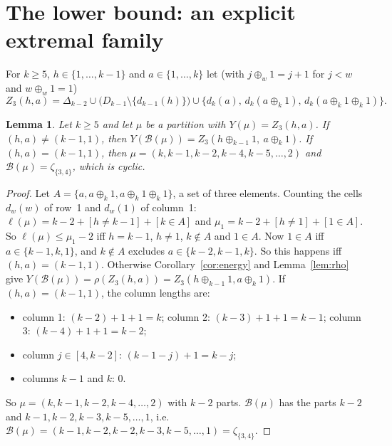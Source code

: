 \documentclass[11pt]{article}
\newtheorem{lemma}[theorem]{Lemma}
\theoremstyle{definition}
\newcommand{\B}{\mathcal{B}}
\renewcommand{\le}{\leqslant}
\renewcommand{\ge}{\geqslant}
\begin{document}
\section{The lower bound: an explicit extremal family}\label{sec:c5lower}

For $k\ge5$, $h\in\{1,\dots,k-1\}$ and $a\in\{1,\dots,k\}$ let (with $j\oplus_w1=j+1$ for $j<w$ and $w\oplus_w1=1$)
\[Z_3(h,a)=\Delta_{k-2}\cup\bigl(D_{k-1}\setminus\{d_{k-1}(h)\}\bigr)\cup\{d_k(a),\,d_k(a\oplus_k1),\,d_k(a\oplus_k1\oplus_k1)\}.\]

\begin{lemma}\label{lem:c5conf}
Let $k\ge5$ and let $\mu$ be a partition with $Y(\mu)=Z_3(h,a)$.  If $(h,a)\ne(k-1,1)$, then
$Y(\B(\mu))=Z_3(h\oplus_{k-1}1,\ a\oplus_k1)$.  If $(h,a)=(k-1,1)$, then $\mu=(k,k-1,k-2,k-4,k-5,\dots,2)$ and
$\B(\mu)=\zeta_{\{3,4\}}$, which is cyclic.
\end{lemma}
\begin{proof}
Let $A=\{a,a\oplus_k1,a\oplus_k1\oplus_k1\}$, a set of three elements.  Counting the cells $d_w(w)$ of row~1 and $d_w(1)$ of
column~1: $\ell(\mu)=k-2+[h\ne k-1]+[k\in A]$ and $\mu_1=k-2+[h\ne1]+[1\in A]$.  So $\ell(\mu)\le\mu_1-2$ iff $h=k-1$,
$h\ne1$, $k\notin A$ and $1\in A$.  Now $1\in A$ iff $a\in\{k-1,k,1\}$, and $k\notin A$ excludes $a\in\{k-2,k-1,k\}$.  So
this happens iff $(h,a)=(k-1,1)$.  Otherwise Corollary~\ref{cor:energy} and Lemma~\ref{lem:rho} give
$Y(\B(\mu))=\rho(Z_3(h,a))=Z_3(h\oplus_{k-1}1,a\oplus_k1)$.
If $(h,a)=(k-1,1)$, the column lengths are:
\begin{itemize}
\item column 1: $(k-2)+1+1=k$; column 2: $(k-3)+1+1=k-1$; column 3: $(k-4)+1+1=k-2$;
\item column $j\in[4,k-2]$: $(k-1-j)+1=k-j$;
\item columns $k-1$ and $k$: $0$.
\end{itemize}
So $\mu=(k,k-1,k-2,k-4,\dots,2)$ with $k-2$ parts.  $\B(\mu)$ has the parts $k-2$ and $k-1,k-2,k-3,k-5,\dots,1$, i.e.\
$\B(\mu)=(k-1,k-2,k-2,k-3,k-5,\dots,1)=\zeta_{\{3,4\}}$.
\end{proof}
\end{document}
